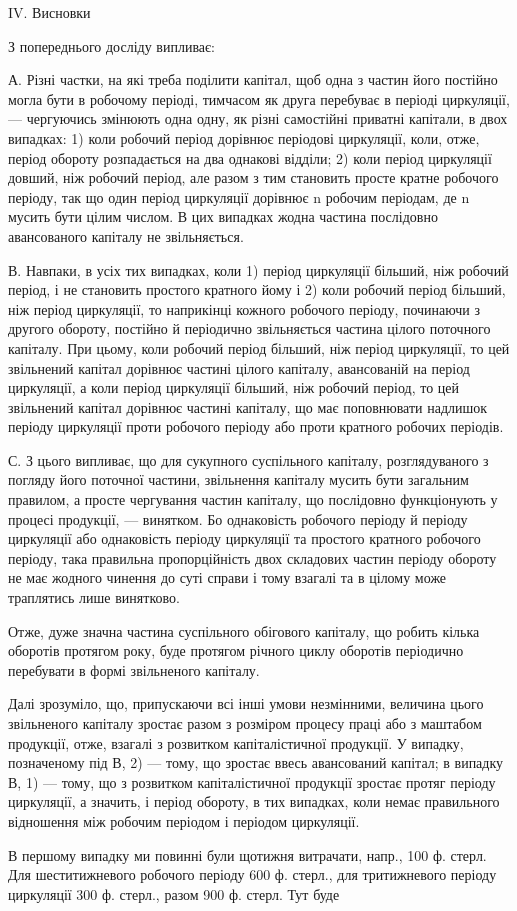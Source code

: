 IV. Висновки

З попереднього досліду випливає:

А. Різні частки, на які треба поділити капітал, щоб одна з частин
його постійно могла бути в робочому періоді, тимчасом як друга перебуває
в періоді циркуляції, — чергуючись змінюють одна одну, як різні
самостійні приватні капітали, в двох випадках: 1) коли робочий період
дорівнює періодові циркуляції, коли, отже, період обороту розпадається
на два однакові відділи; 2) коли період циркуляції довший, ніж робочий
період, але разом з тим становить просте кратне робочого періоду, так
що один період циркуляції дорівнює n робочим періодам, де n мусить
бути цілим числом. В цих випадках жодна частина послідовно авансованого
капіталу не звільняється.

В. Навпаки, в усіх тих випадках, коли 1) період циркуляції більший,
ніж робочий період, і не становить простого кратного йому і 2) коли
робочий період більший, ніж період циркуляції, то наприкінці кожного
робочого періоду, починаючи з другого обороту, постійно й періодично
звільняється частина цілого поточного капіталу. При цьому, коли робочий
період більший, ніж період циркуляції, то цей звільнений капітал
дорівнює частині цілого капіталу, авансованій на період циркуляції, а
коли період циркуляції більший, ніж робочий період, то цей звільнений
капітал дорівнює частині капіталу, що має поповнювати надлишок періоду
циркуляції проти робочого періоду або проти кратного робочих періодів.

С. З цього випливає, що для сукупного суспільного капіталу, розглядуваного
з погляду його поточної частини, звільнення капіталу
мусить бути загальним правилом, а просте чергування частин капіталу,
що послідовно функціонують у процесі продукції, — винятком. Бо однаковість
робочого періоду й періоду циркуляції або однаковість періоду
циркуляції та простого кратного робочого періоду, така правильна пропорційність
двох складових частин періоду обороту не має жодного
чинення до суті справи і тому взагалі та в цілому може траплятись лише
винятково.

Отже, дуже значна частина суспільного обігового капіталу, що робить
кілька оборотів протягом року, буде протягом річного циклу оборотів
періодично перебувати в формі звільненого капіталу.

Далі зрозуміло, що, припускаючи всі інші умови незмінними, величина
цього звільненого капіталу зростає разом з розміром процесу праці
або з маштабом продукції, отже, взагалі з розвитком капіталістичної
продукції. У випадку, позначеному під В, 2) — тому, що зростає ввесь
авансований капітал; в випадку В, 1) — тому, що з розвитком капіталістичної
продукції зростає протяг періоду циркуляції, а значить, і період
обороту, в тих випадках, коли немає правильного відношення між робочим
періодом і періодом циркуляції.

В першому випадку ми повинні були щотижня витрачати, напр.,
100 ф. стерл. Для шеститижневого робочого періоду 600 ф. стерл., для тритижневого
періоду циркуляції 300 ф. стерл., разом 900 ф. стерл. Тут буде
\parbreak{}  %
